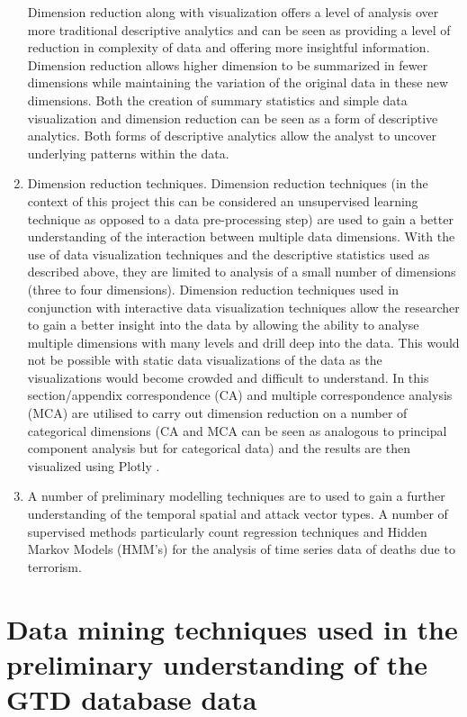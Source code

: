 \begin{enumerate}
Dimension reduction along with visualization offers a level of analysis over more traditional descriptive analytics and can be seen as providing a level of reduction in complexity of data and offering more insightful information. Dimension reduction allows higher dimension to be summarized in fewer dimensions while maintaining the variation of the original data in these new dimensions.  Both the creation of summary statistics and simple data visualization and dimension reduction can be seen as a form of descriptive analytics. Both forms of descriptive analytics allow the analyst to uncover underlying patterns within the data.
\item Dimension reduction techniques. Dimension reduction techniques (in the context of this project this can be considered an unsupervised learning technique as opposed to a data pre-processing step) are used to gain a better understanding of the interaction between multiple data dimensions. With the use of data visualization techniques and the descriptive statistics used as described above, they are limited to analysis of a small number of dimensions (three to four dimensions). Dimension reduction techniques used in conjunction with interactive data visualization techniques  allow the researcher to gain a better insight into the data by allowing the ability to analyse multiple dimensions with many levels and drill deep into the data. This would not be possible with static data visualizations of the data as the visualizations would become crowded and difficult to understand. In this section/appendix correspondence (CA) and multiple correspondence analysis (MCA) \citep{factominer2008} are utilised to carry out dimension reduction on a number of categorical dimensions (CA and MCA can be seen as analogous to principal component analysis but for categorical data) and the results are then visualized using Plotly \citep{plotlymanual2016}. 
\item A number of preliminary modelling techniques are to used to gain a further understanding of the temporal spatial and attack vector types. A number of supervised methods particularly count regression techniques and Hidden Markov Models (HMM's) for the analysis of time series data of deaths due to terrorism.  
\end{enumerate}

\section{Data mining techniques used in the preliminary understanding of the GTD database data}
\label{sec:chap4dataprep}

